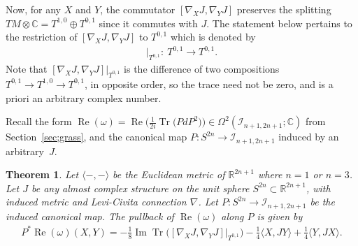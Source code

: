 \documentclass[10pt,a4paper]{amsart}
\DeclareMathOperator{\Tr}{Tr}
\newtheorem{thm}{Theorem}[section]
\numberwithin{equation}{section}
\newcommand{\R}{\mathbb{R}}
\newcommand{\CC}{\mathbb{C}}
\newcommand{\cI}{{\mathcal I}}
\begin{document}
 Now, for any $X$ and $Y$, the commutator $[\nabla_X J, \nabla_Y J]$ preserves the splitting $TM \otimes \CC = T^{1,0} \oplus T^{0,1}$ since it commutes with $J$. The statement below pertains to the restriction of $[\nabla_X J, \nabla_Y J]$ to $T^{0,1}$ which is denoted by
 \begin{gather*}
[ \nabla_X J , \nabla_Y J ] \big|_{T^{0,1}} \colon \ T^{0,1} \to T^{0,1}.
 \end{gather*}
 Note that $ [ \nabla_X J , \nabla_Y J ] \big|_{T^{0,1}}$ is the difference of two compositions $T^{0,1} \to T^{1,0} \to T^{0,1}$, in opposite order, so the trace need not be zero, and is a priori an arbitrary complex number.

Recall the form $\operatorname{Re}(\omega) = \operatorname{Re}\big( \frac{1}{ 2i} \Tr\big(PdP^2\big) \big) \in \Omega^2(\cI_{n+1,2n+1};\CC)$ from Section~\ref{sec;grass}, and the cano\-ni\-cal map $P\colon S^{2n} \to \cI_{n+1,2n+1}$ induced by an arbitrary~$J$.

\begin{thm} \label{thm;Pcanon}
Let $\langle -,- \rangle $ be the Euclidean metric of $\R^{2n+1}$ where $n=1$ or $n=3$. Let $J$ be any almost complex structure on the unit sphere $S^{2n} \subset \R^{2n+1}$, with induced metric and Levi-Civita connection $\nabla$. Let $P\colon S^{2n} \to \cI_{n+1,2n+1}$ be the induced canonical map. The pullback of $\operatorname{Re}(\omega)$ along $P$ is given by
\begin{gather*}
 P^* \operatorname{Re} ( \omega) (X,Y) =-\frac{1}{8} \operatorname{Im} \Tr \big([ \nabla_X J , \nabla_Y J ] \big|_{T^{0,1}} \big)
 - \frac 1 4 \langle X,JY \rangle + \frac 1 4 \langle Y,JX \rangle .
\end{gather*}
\end{thm}
\end{document}
